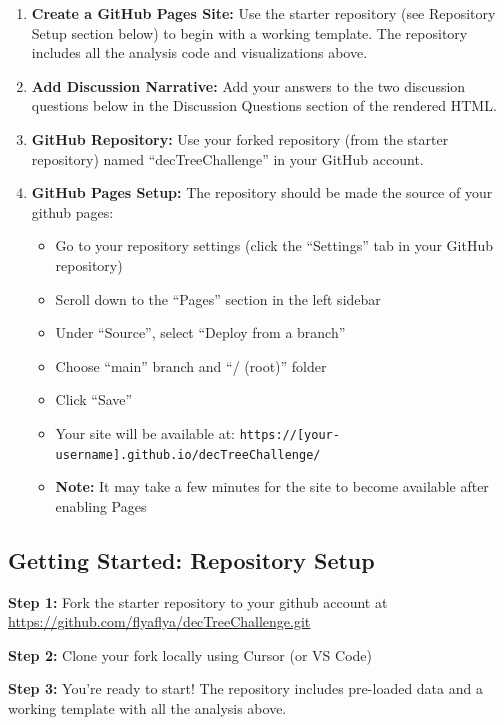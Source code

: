 \documentclass[
  letterpaper,
  DIV=11,
  numbers=noendperiod]{scrartcl}
\providecommand{\tightlist}{%
  \setlength{\itemsep}{0pt}\setlength{\parskip}{0pt}}
\begin{document}
\begin{enumerate}
\def\labelenumi{\arabic{enumi}.}
\item
  \textbf{Create a GitHub Pages Site:} Use the starter repository (see
  Repository Setup section below) to begin with a working template. The
  repository includes all the analysis code and visualizations above.
\item
  \textbf{Add Discussion Narrative:} Add your answers to the two
  discussion questions below in the Discussion Questions section of the
  rendered HTML.
\item
  \textbf{GitHub Repository:} Use your forked repository (from the
  starter repository) named ``decTreeChallenge'' in your GitHub account.
\item
  \textbf{GitHub Pages Setup:} The repository should be made the source
  of your github pages:

  \begin{itemize}
  \tightlist
  \item
    Go to your repository settings (click the ``Settings'' tab in your
    GitHub repository)
  \item
    Scroll down to the ``Pages'' section in the left sidebar
  \item
    Under ``Source'', select ``Deploy from a branch''
  \item
    Choose ``main'' branch and ``/ (root)'' folder
  \item
    Click ``Save''
  \item
    Your site will be available at:
    \texttt{https://{[}your-username{]}.github.io/decTreeChallenge/}
  \item
    \textbf{Note:} It may take a few minutes for the site to become
    available after enabling Pages
  \end{itemize}
\end{enumerate}

\subsection{Getting Started: Repository Setup
🚀}\label{getting-started-repository-setup}

\begin{tcolorbox}[enhanced jigsaw, bottomtitle=1mm, coltitle=black, rightrule=.15mm, colbacktitle=quarto-callout-important-color!10!white, opacityback=0, colback=white, toptitle=1mm, title=\textcolor{quarto-callout-important-color}{\faExclamation}\hspace{0.5em}{📁 Quick Start with Starter Repository}, titlerule=0mm, left=2mm, arc=.35mm, colframe=quarto-callout-important-color-frame, leftrule=.75mm, bottomrule=.15mm, toprule=.15mm, opacitybacktitle=0.6, breakable]

\textbf{Step 1:} Fork the starter repository to your github account at
\url{https://github.com/flyaflya/decTreeChallenge.git}

\textbf{Step 2:} Clone your fork locally using Cursor (or VS Code)

\textbf{Step 3:} You're ready to start! The repository includes
pre-loaded data and a working template with all the analysis above.

\end{tcolorbox}
\end{document}

